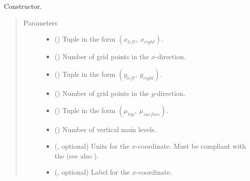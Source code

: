 \documentclass[letterpaper,10pt,english]{sphinxmanual}
\begin{document}
\begin{fulllineitems}
\begin{fulllineitems}
\label{\detokenize{api:grids.sleve.SLEVE3d.__init__}}
Constructor.
\begin{quote}\begin{description}
\item[{Parameters}] \leavevmode\begin{itemize}
\item {} 
 () \textendash{} Tuple in the form \((x_{left}, ~ x_{right})\).

\item {} 
 () \textendash{} Number of grid points in the \(x\)-direction.

\item {} 
 () \textendash{} Tuple in the form \((y_{left}, ~ y_{right})\).

\item {} 
 () \textendash{} Number of grid points in the \(y\)-direction.

\item {} 
 () \textendash{} Tuple in the form \((\mu_{top}, ~ \mu_{surface})\).

\item {} 
 () \textendash{} Number of vertical main levels.

\item {} 
 (, optional) \textendash{} 
Units for the \(x\)-coordinate. Must be compliant with the 
(see also {\hyperref[\detokenize{api:grids.axis.Axis.__init__}]{}}).


\item {} 
 (, optional) \textendash{} Label for the \(x\)-coordinate.


\end{itemize}
\end{description}
\end{quote}
\end{fulllineitems}
\end{fulllineitems}
\end{document}
